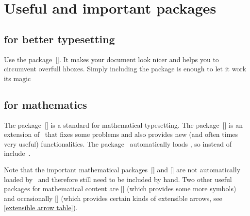 \chapter{Useful and important packages}










\section{ for better typesetting}

Use the package~[\packname].
It makes your document look nicer and helps you to circumvent overfull hboxes.
Simply including the package is enough to let it work its magic





\section{ for mathematics}

The package~[\packname] is a standard for mathematical typesetting.
The package~[\packname] is an extension of~ that fixes some problems and also provides new (and often times very useful) functionalities.
The package~ automatically loads , so instead of~ include~.

Note that the important mathematical packages~[\packname] and [\packname] are not automatically loaded by~ and therefore still need to be included by hand.
Two other useful packages for mathematical content are [\packname] (which provides some more symbols) and occasionally [\packname] (which provides certain kinds of extensible arrows, see \cref{extensible arrow table}).





